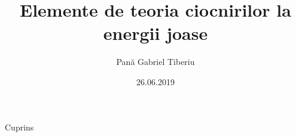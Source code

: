 \documentclass[fleqn]{beamer}
\title{Elemente de teoria ciocnirilor la energii joase}
\author{Pan\u{a} Gabriel Tiberiu}
\date{26.06.2019}
\begin{document}
\footnotesize
  \maketitle
  \begin{frame}[allowframebreaks]{Cuprins}
   \tableofcontents
  \end{frame}

  
  
\end{document}
